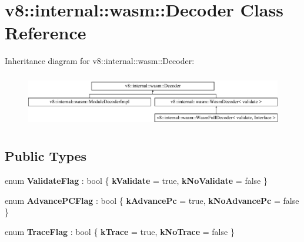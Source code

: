 \hypertarget{classv8_1_1internal_1_1wasm_1_1Decoder}{}\section{v8\+:\+:internal\+:\+:wasm\+:\+:Decoder Class Reference}
\label{classv8_1_1internal_1_1wasm_1_1Decoder}
Inheritance diagram for v8\+:\+:internal\+:\+:wasm\+:\+:Decoder\+:\begin{figure}[H]
\begin{center}
\leavevmode
\includegraphics[height=2.366197cm]{classv8_1_1internal_1_1wasm_1_1Decoder}
\end{center}
\end{figure}
\subsection*{Public Types}
\begin{DoxyCompactItemize}
\item 
\mbox{\label{classv8_1_1internal_1_1wasm_1_1Decoder_aaca68ed27e16023589cf55b8c65af1f8}} 
enum {\bfseries Validate\+Flag} \+: bool \{ {\bfseries k\+Validate} = true, 
{\bfseries k\+No\+Validate} = false
 \}
\item 
\mbox{\label{classv8_1_1internal_1_1wasm_1_1Decoder_aa4085b55680da0dd273a2c83473c5b7e}} 
enum {\bfseries Advance\+P\+C\+Flag} \+: bool \{ {\bfseries k\+Advance\+Pc} = true, 
{\bfseries k\+No\+Advance\+Pc} = false
 \}
\item 
\mbox{\label{classv8_1_1internal_1_1wasm_1_1Decoder_aa4f018c68ac7a43bc4743f33b77dfb34}} 
enum {\bfseries Trace\+Flag} \+: bool \{ {\bfseries k\+Trace} = true, 
{\bfseries k\+No\+Trace} = false
 \}
\end{DoxyCompactItemize}
